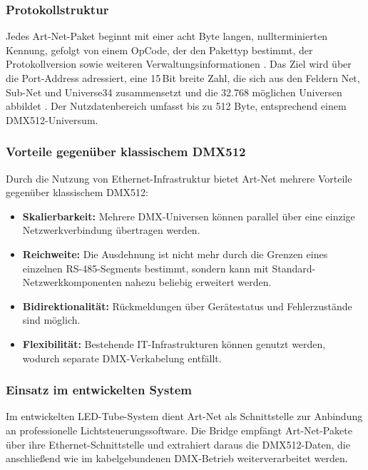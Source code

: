 \subsubsection{Protokollstruktur}
\label{subsubsec:artnet-protokoll}

Jedes Art-Net-Paket beginnt mit einer acht Byte langen, nullterminierten Kennung, 
gefolgt von einem OpCode, der den Pakettyp bestimmt, der
Protokollversion sowie weiteren Verwaltungsinformationen \cite{artnet4}. Das Ziel wird
über die Port-Address adressiert, eine 15\,Bit breite Zahl, die sich aus den
Feldern Net, Sub-Net und Universe34 zusammensetzt und die 32.768 möglichen Universen
abbildet \cite{artnet4}. Der Nutzdatenbereich umfasst bis zu 512 Byte, entsprechend
einem DMX512-Universum.

\subsubsection{Vorteile gegenüber klassischem DMX512}
\label{subsubsec:artnet-vorteile}

Durch die Nutzung von Ethernet-Infrastruktur bietet Art-Net mehrere Vorteile gegenüber
klassischem DMX512:
\begin{itemize}
    \item \textbf{Skalierbarkeit:} Mehrere DMX-Universen können parallel über eine
          einzige Netzwerkverbindung übertragen werden.
    \item \textbf{Reichweite:} Die Ausdehnung ist nicht mehr durch die Grenzen eines
          einzelnen RS-485-Segments bestimmt, sondern kann mit
          Standard-Netzwerkkomponenten nahezu beliebig erweitert werden.
    \item \textbf{Bidirektionalität:} Rückmeldungen über Gerätestatus und Fehlerzustände sind möglich.
    \item \textbf{Flexibilität:} Bestehende IT-Infrastrukturen können genutzt werden,
          wodurch separate DMX-Verkabelung entfällt.
\end{itemize}

\subsubsection{Einsatz im entwickelten System}
\label{subsubsec:artnet-system}

Im entwickelten LED-Tube-System dient Art-Net als Schnittstelle zur Anbindung an
professionelle Lichtsteuerungssoftware. Die Bridge empfängt Art-Net-Pakete über ihre
Ethernet-Schnittstelle und extrahiert daraus die DMX512-Daten, die anschließend wie im
kabelgebundenen DMX-Betrieb weiterverarbeitet werden.

